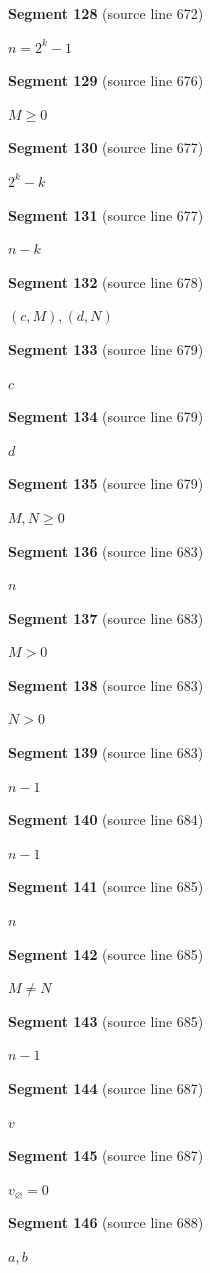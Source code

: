 \documentclass[11pt]{article}
\begin{document}
\textbf{Segment 128} (source line 672)\par
\( n=2^k-1 \)\par
\textbf{Segment 129} (source line 676)\par
\( M\ge0 \)\par
\textbf{Segment 130} (source line 677)\par
\( 2^k-k \)\par
\textbf{Segment 131} (source line 677)\par
\( n-k \)\par
\textbf{Segment 132} (source line 678)\par
\( (c,M),(d,N) \)\par
\textbf{Segment 133} (source line 679)\par
\( c \)\par
\textbf{Segment 134} (source line 679)\par
\( d \)\par
\textbf{Segment 135} (source line 679)\par
\( M,N\ge0 \)\par
\textbf{Segment 136} (source line 683)\par
\( n \)\par
\textbf{Segment 137} (source line 683)\par
\( M>0 \)\par
\textbf{Segment 138} (source line 683)\par
\( N>0 \)\par
\textbf{Segment 139} (source line 683)\par
\( n-1 \)\par
\textbf{Segment 140} (source line 684)\par
\( n-1 \)\par
\textbf{Segment 141} (source line 685)\par
\( n \)\par
\textbf{Segment 142} (source line 685)\par
\( M\ne N \)\par
\textbf{Segment 143} (source line 685)\par
\( n-1 \)\par
\textbf{Segment 144} (source line 687)\par
\( v \)\par
\textbf{Segment 145} (source line 687)\par
\( v_\varnothing=0 \)\par
\textbf{Segment 146} (source line 688)\par
\( a,b \)\par
\end{document}
